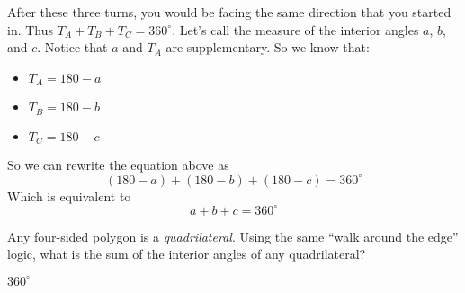 After these three turns, you would be facing the same direction that
you started in. Thus $T_A + T_B + T_C = 360^\circ$. Let's call the
measure of the interior angles $a$, $b$, and $c$.  Notice that $a$ and
$T_A$ are supplementary. So we know that:
\begin{itemize}
\item $T_A = 180 - a$
\item $T_B = 180 - b$
\item $T_C = 180 - c$
\end{itemize}
So we can rewrite the equation above as
\begin{equation*}
  (180 - a) + (180 - b) + (180 - c) = 360^\circ
\end{equation*}
Which is equivalent to
\begin{equation*}
  a + b + c = 360^\circ
\end{equation*}

\begin{Exercise}[title={Interior Angles of a Quadrilateral}, label=interior_of_quad]
  Any four-sided polygon is a \emph{quadrilateral}.  Using the same
  ``walk around the edge'' logic, what is the sum of the interior
  angles of any quadrilateral?
\end{Exercise}
\begin{Answer}[ref=interior_of_quad]
$360^\circ$
\end{Answer}

